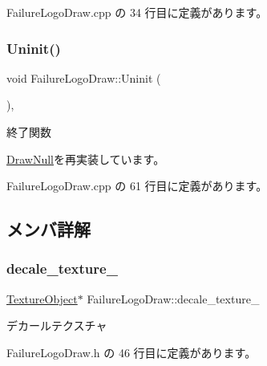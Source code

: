  Failure\+Logo\+Draw.\+cpp の 34 行目に定義があります。

\mbox{\label{class_failure_logo_draw_a97646253380b54f37565650e211f33cd}} 
\subsubsection{\texorpdfstring{Uninit()}{Uninit()}}
{\footnotesize\ttfamily void Failure\+Logo\+Draw\+::\+Uninit (\begin{DoxyParamCaption}{ }\end{DoxyParamCaption})\hspace{0.3cm}{\ttfamily [override]}, {\ttfamily [virtual]}}



終了関数 



\mbox{\hyperlink{class_draw_null_a6e81d63efab7333e8d0e8af99362a4d9}{Draw\+Null}}を再実装しています。



 Failure\+Logo\+Draw.\+cpp の 61 行目に定義があります。



\subsection{メンバ詳解}
\mbox{\label{class_failure_logo_draw_a02463e67fa2053739c667bb1213e1b9e}} 
\subsubsection{\texorpdfstring{decale\+\_\+texture\+\_\+}{decale\_texture\_}}
{\footnotesize\ttfamily \mbox{\hyperlink{class_texture_object}{Texture\+Object}}$\ast$ Failure\+Logo\+Draw\+::decale\+\_\+texture\+\_\+\hspace{0.3cm}{\ttfamily [private]}}



デカールテクスチャ 



 Failure\+Logo\+Draw.\+h の 46 行目に定義があります。

